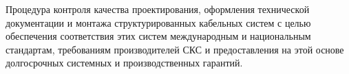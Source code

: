Процедура контроля качества проектирования, оформления
технической документации и монтажа структурированных
кабельных систем с целью обеспечения соответствия этих
систем международным и национальным стандартам, требованиям
производителей СКС и предоставления на этой основе
долгосрочных системных и производственных гарантий.